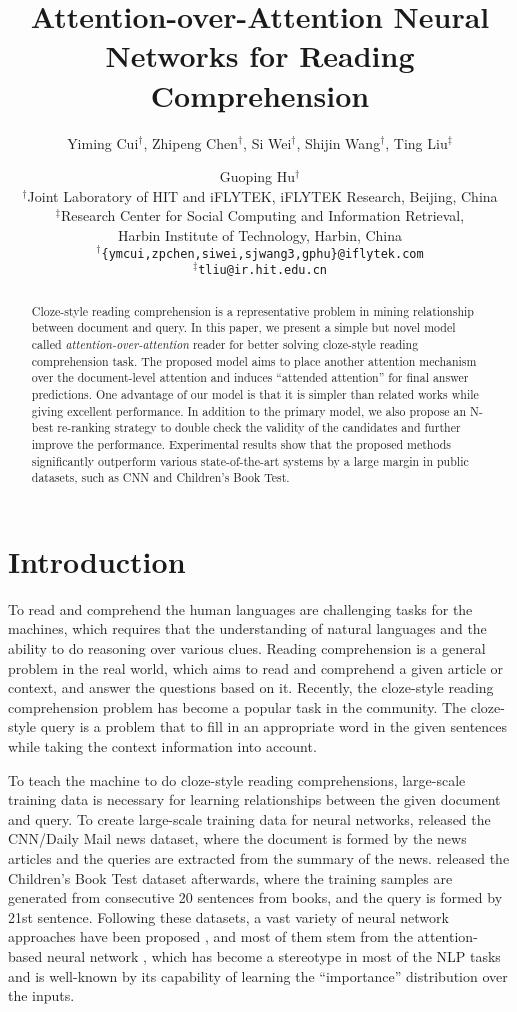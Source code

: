 \documentclass[11pt,a4paper]{article}
\title{Attention-over-Attention Neural Networks for Reading Comprehension}
\author{Yiming Cui$^\dag$, Zhipeng Chen$^\dag$, Si Wei$^\dag$, Shijin Wang$^\dag$, Ting Liu$^\ddag$ \and Guoping Hu$^\dag$\\
{$^\dag$Joint Laboratory of HIT and iFLYTEK, iFLYTEK Research, Beijing, China}\\
{$^\ddag$Research Center for Social Computing and Information Retrieval,}\\
{Harbin Institute of Technology, Harbin, China}\\
{$^\dag$\tt\{ymcui,zpchen,siwei,sjwang3,gphu\}@iflytek.com}\\  
{$^\ddag$\tt tliu@ir.hit.edu.cn}\\
}
\date{}
\begin{document}
\maketitle

\begin{abstract}
Cloze-style reading comprehension is a representative problem in mining relationship between document and query.
In this paper, we present a simple but novel model called {\em attention-over-attention} reader for better solving cloze-style reading comprehension task.
The proposed model aims to place another attention mechanism over the document-level attention and induces ``attended attention'' for final answer predictions.
One advantage of our model is that it is simpler than related works while giving excellent performance.
In addition to the primary model, we also propose an N-best re-ranking strategy to double check the validity of the candidates and further improve the performance.
Experimental results show that the proposed methods significantly outperform various state-of-the-art systems by a large margin in public datasets, such as CNN and Children's Book Test.
\end{abstract}


\section{Introduction}\label{introduction}
To read and comprehend the human languages are challenging tasks for the machines, which requires that the understanding of natural languages and the ability to do reasoning over various clues. 
Reading comprehension is a general problem in the real world, which aims to read and comprehend a given article or context, and answer the questions based on it. 
Recently, the cloze-style reading comprehension problem has become a popular task in the community.
The cloze-style query \cite{taylor-etal-1953} is a problem that to fill in an appropriate word in the given sentences while taking the context information into account.

To teach the machine to do cloze-style reading comprehensions, large-scale training data is necessary for learning relationships between the given document and query.
To create large-scale training data for neural networks,  released the CNN/Daily Mail news dataset, where the document is formed by the news articles and the queries are extracted from the summary of the news. 
 released the Children's Book Test dataset afterwards, where the training samples are generated from consecutive 20 sentences from books, and the query is formed by 21st sentence. 
Following these datasets, a vast variety of neural network approaches have been proposed \citep{kadlec-etal-2016,cui-etal-2016,chen-etal-2016,dhingra-etal-2016,sordoni-etal-2016,trischler-etal-2016,seo-etal-2016,xiong-etal-2016}, and most of them stem from the attention-based neural network \cite{bahdanau-etal-2014}, which has become a stereotype in most of the NLP tasks and is well-known by its capability of learning the ``importance'' distribution over the inputs.
\end{document}
